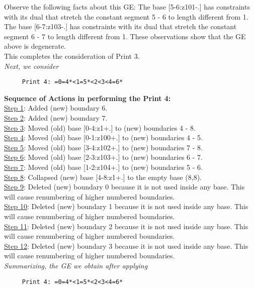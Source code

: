 \documentclass[final]{article}
\begin{document}
Observe the following facts about this GE:
The base [5-6:z101-.]  has constraints with its dual that stretch the constant segment 5 - 6 to length different from 1.  The base [6-7:z103-.]  has constraints with its dual that stretch the constant segment 6 - 7 to length different from 1.  These observations show that the GE above is degenerate.\\[0.1in]
This completes the consideration of Print 3.\\[0.1in]
{\em Next, we consider}
\begin{verbatim}
     Print 4: =0=4*<1=5*<2<3<4=6*
\end{verbatim}
{\bf Sequence of Actions in performing the Print 4:}\\
{\underline{Step 1}:} Added (new) boundary 6.\\
{\underline{Step 2}:} Added (new) boundary 7.\\
{\underline{Step 3}:} Moved (old) base [0-4:z1+.]  to (new) boundaries 4 - 8.\\
{\underline{Step 4}:} Moved (old) base [0-1:z100+.]  to (new) boundaries 4 - 5.\\
{\underline{Step 5}:} Moved (old) base [3-4:z102+.]  to (new) boundaries 7 - 8.\\
{\underline{Step 6}:} Moved (old) base [2-3:z103+.]  to (new) boundaries 6 - 7.\\
{\underline{Step 7}:} Moved (old) base [1-2:z104+.]  to (new) boundaries 5 - 6.\\
{\underline{Step 8}:} Collapsed (new) base [4-8:z1+.]  to the empty base (8,8).
\\
{\underline{Step 9}:} Deleted (new) boundary 0 because it is not used inside any base.  This will cause renumbering of higher numbered boundaries.
\\
{\underline{Step 10}:} Deleted (new) boundary 1 because it is not used inside any base.  This will cause renumbering of higher numbered boundaries.
\\
{\underline{Step 11}:} Deleted (new) boundary 2 because it is not used inside any base.  This will cause renumbering of higher numbered boundaries.
\\
{\underline{Step 12}:} Deleted (new) boundary 3 because it is not used inside any base.  This will cause renumbering of higher numbered boundaries.
\\[0.1in]
{\em Summarizing, the GE we obtain after applying}
\begin{verbatim}
     Print 4: =0=4*<1=5*<2<3<4=6*
\end{verbatim}
\end{document}
